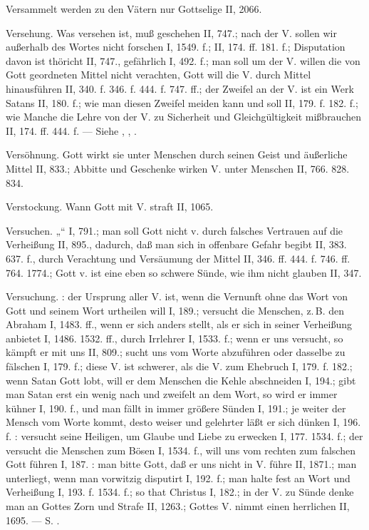 Versammelt werden zu den Vätern nur Gottselige II, 2066.

Versehung. Was versehen ist, muß geschehen II, 747.; nach der V. sollen wir außerhalb des Wortes nicht forschen
I, 1549. f.; II, 174. ff. 181. f.; Disputation davon ist thöricht II, 747., gefährlich I, 492. f.; man soll um der V. willen die von Gott geordneten Mittel nicht verachten, Gott will die V. durch Mittel hinausführen II, 340. f. 346. f. 444. f. 747. ff.; der Zweifel an der V. ist ein Werk Satans II, 180. f.; wie man diesen Zweifel meiden kann und soll II, 179. f. 182. f.; wie Manche die Lehre von der V. zu Sicherheit und Gleichgültigkeit mißbrauchen II, 174. ff. 444. f. — Siehe , , .

Versöhnung. Gott wirkt sie unter Menschen durch seinen Geist und äußerliche Mittel II, 833.; Abbitte und Geschenke wirken V. unter Menschen II, 766. 828. 834.

Verstockung. Wann Gott mit V. straft II, 1065.

Versuchen. „“ I, 791.; man soll Gott nicht v. durch falsches Vertrauen auf die Verheißung II, 895., dadurch, daß man sich in offenbare Gefahr begibt II, 383. 637. f., durch Verachtung und Versäumung der Mittel II, 346. ff. 444. f. 746. ff. 764. 1774.; Gott v. ist eine eben so schwere Sünde, wie ihm nicht glauben II, 347.

Versuchung. : der Ursprung aller V. ist, wenn die Vernunft ohne das Wort von Gott und seinem Wort urtheilen will I, 189.;  versucht die Menschen, z.\,B. den Abraham I, 1483. ff., wenn er sich anders stellt, als er sich in seiner Verheißung anbietet I, 1486. 1532. ff., durch Irrlehrer I, 1533. f.; wenn er uns versucht, so kämpft er mit uns II, 809.;  sucht uns vom Worte abzuführen oder dasselbe zu fälschen I, 179. f.; diese V. ist schwerer, als die V. zum Ehebruch I, 179. f. 182.; wenn Satan Gott lobt, will er dem Menschen die Kehle abschneiden I, 194.; gibt man Satan erst ein wenig nach und zweifelt an dem Wort, so wird er immer kühner I, 190. f., und man fällt in immer größere Sünden I, 191.; je weiter der Mensch vom Worte kommt, desto weiser und gelehrter läßt er sich dünken I, 196. f. :  versucht seine Heiligen, um Glaube und Liebe zu erwecken I, 177. 1534. f.; der  versucht die Menschen zum Bösen I, 1534. f., will uns vom rechten zum falschen Gott führen I, 187. : man bitte Gott, daß er uns nicht in V. führe II, 1871.; man unterliegt, wenn man vorwitzig disputirt I, 192. f.; man halte fest an Wort und Verheißung I, 193. f. 1534. f.; so that Christus I, 182.; in der V. zu Sünde denke man an Gottes Zorn und Strafe II, 1263.; Gottes V. nimmt einen herrlichen  II, 1695. — S. .

